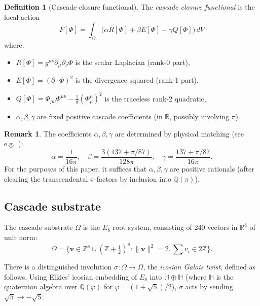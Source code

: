 \documentclass[11pt, a4paper]{amsart}
\theoremstyle{definition}
\newtheorem{definition}[theorem]{Definition}
\newtheorem{remark}[theorem]{Remark}
\newcommand{\R}{\mathbb{R}}
\newcommand{\Z}{\mathbb{Z}}
\newcommand{\Q}{\mathbb{Q}}
\begin{document}
\begin{definition}[Cascade closure functional]\label{def:F}
The \emph{cascade closure functional} is the local action
\begin{equation}\label{eq:F}
F[\Phi] = \int_\Omega \big(\alpha R[\Phi] + \beta E[\Phi] - \gamma Q[\Phi]\big) \, dV
\end{equation}
where:
\begin{itemize}
\item $R[\Phi] = g^{\mu\nu}\partial_\mu \partial_\nu \Phi$ is the
  scalar Laplacian (rank-0 part),
\item $E[\Phi] = (\partial \cdot \Phi)^2$ is the divergence
  squared (rank-1 part),
\item $Q[\Phi] = \Phi_{\mu\nu}\Phi^{\mu\nu} - \frac{1}{d}(\Phi^\mu_\mu)^2$
  is the traceless rank-2 quadratic,
\item $\alpha, \beta, \gamma$ are fixed positive cascade coefficients (in $\R$, possibly involving $\pi$).
\end{itemize}
\end{definition}

\begin{remark}\label{rem:coeffs}
The coefficients $\alpha, \beta, \gamma$ are determined by physical
matching (see e.g.~\cite{cascadeF8}):
\[
\alpha = \frac{1}{16\pi}, \quad
\beta = \frac{3(137 + \pi/87)}{128\pi}, \quad
\gamma = \frac{137 + \pi/87}{16\pi}.
\]
For the purposes of this paper, it suffices that $\alpha, \beta, \gamma$
are positive rationals (after clearing the transcendental $\pi$-factors
by inclusion into $\Q(\pi)$).
\end{remark}

\subsection{Cascade substrate}

The cascade substrate $\Omega$ is the $E_8$ root system, consisting of
240 vectors in $\R^8$ of unit norm:
\[
\Omega = \big\{ \mathbf{v} \in \Z^8 \cup (\Z + \tfrac{1}{2})^8
 : \|\mathbf{v}\|^2 = 2, \sum v_i \in 2\Z \big\}.
\]

There is a distinguished involution $\sigma : \Omega \to \Omega$,
the \emph{icosian Galois twist}, defined as follows. Using Elkies'
icosian embedding of $E_8$ into $\mathbb{H} \oplus \mathbb{H}$ (where
$\mathbb{H}$ is the quaternion algebra over $\Q(\varphi)$ for
$\varphi = (1 + \sqrt 5)/2$), $\sigma$ acts by sending
$\sqrt 5 \to -\sqrt 5$.
\end{document}
